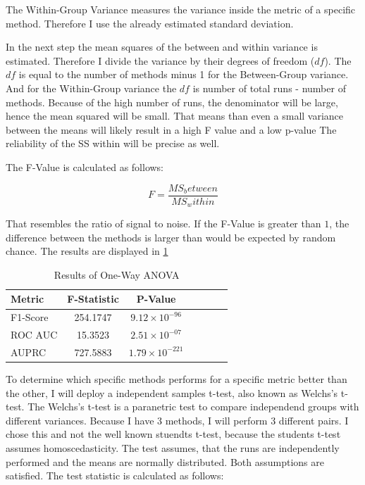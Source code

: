 The Within-Group Variance measures the variance inside the metric of a specific method.
Therefore I use the already estimated standard deviation. 


In the next step the mean squares of the between and within variance is estimated. 
Therefore I divide the variance by their degrees of freedom ($df$).
The $df$ is equal to the number of methods minus 1 for the Between-Group variance.
And for the Within-Group variance the $df$ is number of total runs - number of methods.
Because of the high number of runs, the denominator will be large, hence the mean squared will be small.
That means than even a small variance between the means will likely result in a high F value and a low p-value 
The reliability of the SS within will be precise as well. 


The F-Value is calculated as follows:

\begin{equation}
    F = \frac{MS_between}{MS_within}
\end{equation}

That resembles the ratio of signal to noise.
If the F-Value is greater than $1$, the difference between the methods is larger than would be expected by random chance.
The results are displayed in \ref{tab:ANOVA}


\begin{table}[h]
\centering
\caption{Results of One-Way ANOVA}
\label{tab:ANOVA}
\begin{tabular}{lcccccc} 
\toprule
\textbf{Metric}         & F-Statistic       & P-Value   &   \\
\midrule
F1-Score                & 254.1747          & $9.12 \times 10^{-96}$     &   \\
ROC AUC                 & 15.3523           & $2.51 \times 10^{-07}$     &   \\
AUPRC                   & 727.5883          & $1.79 \times 10^{-221}$     &   \\
\bottomrule
\end{tabular}
\end{table}

To determine which specific methods performs for a specific metric better than the other, I will deploy a independent samples t-test, also known as Welchs's t-test.
The Welchs's t-test is a paranetric test to compare independend groups with different variances. 
Because I have 3 methods, I will perform 3 different pairs.
I chose this and not the well known stuendts t-test, because the students t-test assumes homoscedasticity.
The test assumes, that the runs are independently performed and the means are normally distributed.
Both assumptions are satisfied.
The test statistic is calculated as follows: 


